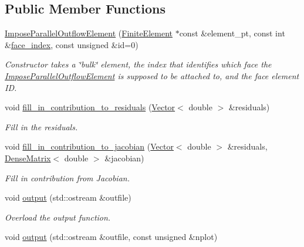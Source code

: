 \subsection*{Public Member Functions}
\begin{DoxyCompactItemize}
\item 
\hyperlink{classoomph_1_1ImposeParallelOutflowElement_ace1712cccb1e4b43ccf13d0dcfefee86}{Impose\+Parallel\+Outflow\+Element} (\hyperlink{classoomph_1_1FiniteElement}{Finite\+Element} $\ast$const \&element\+\_\+pt, const int \&\hyperlink{classoomph_1_1FaceElement_a478d577ac6db67ecc80f1f02ae3ab170}{face\+\_\+index}, const unsigned \&id=0)
\begin{DoxyCompactList}\small\item\em Constructor takes a \char`\"{}bulk\char`\"{} element, the index that identifies which face the \hyperlink{classoomph_1_1ImposeParallelOutflowElement}{Impose\+Parallel\+Outflow\+Element} is supposed to be attached to, and the face element ID. \end{DoxyCompactList}\item 
void \hyperlink{classoomph_1_1ImposeParallelOutflowElement_a843675c8f7cb2f457df56fe69dd84517}{fill\+\_\+in\+\_\+contribution\+\_\+to\+\_\+residuals} (\hyperlink{classoomph_1_1Vector}{Vector}$<$ double $>$ \&residuals)
\begin{DoxyCompactList}\small\item\em Fill in the residuals. \end{DoxyCompactList}\item 
void \hyperlink{classoomph_1_1ImposeParallelOutflowElement_aa299d5f5aa5184db817b4219665c77ed}{fill\+\_\+in\+\_\+contribution\+\_\+to\+\_\+jacobian} (\hyperlink{classoomph_1_1Vector}{Vector}$<$ double $>$ \&residuals, \hyperlink{classoomph_1_1DenseMatrix}{Dense\+Matrix}$<$ double $>$ \&jacobian)
\begin{DoxyCompactList}\small\item\em Fill in contribution from Jacobian. \end{DoxyCompactList}\item 
void \hyperlink{classoomph_1_1ImposeParallelOutflowElement_ac423772737af10cd5efd0c49c3cdef80}{output} (std\+::ostream \&outfile)
\begin{DoxyCompactList}\small\item\em Overload the output function. \end{DoxyCompactList}\item 
void \hyperlink{classoomph_1_1ImposeParallelOutflowElement_a94fce0938876acf656a7c43fc53aa8ca}{output} (std\+::ostream \&outfile, const unsigned \&nplot)

\end{DoxyCompactItemize}
